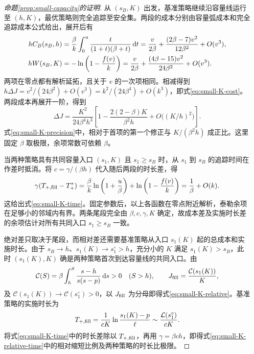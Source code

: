 \documentclass[lang=cn,a4paper,newtx]{elegantpaper}
\theoremstyle{plain}
\theoremstyle{definition}
\newcommand{\dd}{\,\mathrm d}
\begin{document}
\begin{proof}[命题\ref{prop:small-capacity}的证明]
从 $(s_B,K)$ 出发，基准策略继续沿容量线运行至 $(h,K)$，最优策略则完全追踪至安全集。两段的成本分别由容量弧成本和完全追踪成本公式给出，展开后有
\begin{align}
 hC_B(s_B,h)
 &=\frac\beta k\int_0^u\frac{t}{(1+t)(\beta+t)}\dd t
 =\frac v{2\beta}+\frac{(2\beta-7)v^2}{12\beta^2}+O(v^3),\notag\\
 hW(s_B,K)
 &=-\ln\left(1-\frac{f(v)}k\right)
 =\frac v{2\beta}+\frac{(4\beta-15)v^2}{24\beta^2}+O(v^3).
 \label{eq:small-K-cost-series}
\end{align}
两项在零点都有解析延拓，且关于 $v$ 的一次项相同。相减得到 $h\Delta J=v^2/(24\beta^2)+O(v^3)=k^2/(24\beta^4)+O(k^3)$，即式\eqref{eq:small-K-cost}。两段成本再展开一阶，得到
\begin{equation}
 \Delta J=\frac{K^2}{24\beta^4h^3}
 \left[1-\frac{2(2-\beta)K}{\beta^2h}
       +O\bigl((K/h)^2\bigr)\right].
 \label{eq:small-K-precision}
\end{equation}
式\eqref{eq:small-K-precision}中，相对于首项的第一个修正与 $K/(\beta^2h)$ 成正比。这里固定 $\beta$ 取极限，余项常数可依赖 $\beta$。

当两种策略具有共同容量入口 $(s_1,K)$ 且 $s_1\ge s_B$ 时，从 $s_1$ 到 $s_B$ 的追踪时间在作差时抵消。将 $c=\gamma/(\beta h)$ 代入随后两段的时长差，得
\begin{equation}
 \gamma(T_{+,\rm fill}-T_+^*)
 =\frac\beta k\ln\left(1+\frac u\beta\right)
   +\ln\left(1-\frac{f(v)}k\right)
 =\frac1\beta+O(k).
 \label{eq:small-K-time-series}
\end{equation}
这给出式\eqref{eq:small-K-time}。固定参数后，以上各函数在零点附近解析，泰勒余项在足够小的邻域内有界。两条尾段完全由 $\beta,c,\gamma,K$ 确定，故成本差及实施时长差的余项估计对所有共同入口 $s_1\ge s_B$ 一致。

绝对差只取决于尾段，而相对差还需要基准策略从入口 $s_1(K)$ 起的总成本和实施时长。由于 $s_B\to h$、$s_1(K)\to s_1^\circ>h$，充分小的 $K$ 满足 $s_1(K)>s_B$，此时 $(s_1(K),K)$ 确是两种策略首次到达容量线的共同入口。由
\[
 \mathcal C(S)=\beta\int_h^S\frac{s-h}{s(s-p)}\dd s>0\quad(S>h),
 \qquad J_{\rm fill}=\frac{\mathcal C(s_1(K))}K,
\]
及 $\mathcal C(s_1(K))\to\mathcal C(s_1^\circ)>0$，以 $J_{\rm fill}$ 为分母即得式\eqref{eq:small-K-relative}。基准策略的实施时长为
\[
 T_{+,\rm fill}=\frac1{cK}\ln\frac{s_1(K)-p}{\ell}
 \sim\frac{\mathcal L(s_1^\circ)}{cK}.
\]
将式\eqref{eq:small-K-time}中的时长差除以 $T_{+,\rm fill}$，再用 $\gamma=\beta ch$，即得式\eqref{eq:small-K-relative-time}中的相对缩短比例及两种策略的时长比极限。
\end{proof}
\end{document}
